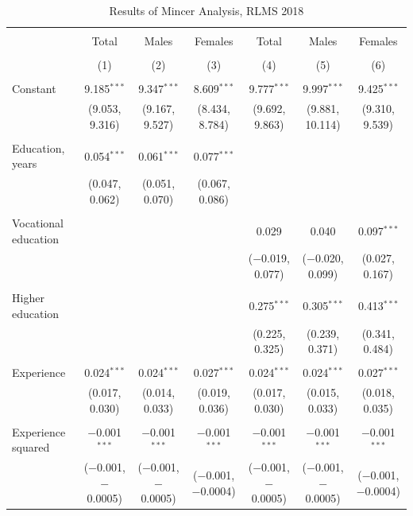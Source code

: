 \documentclass[alpha-refs]{wiley-article-01g}
\begin{document}
\begin{landscape}

\fontsize{9}{11}
\selectfont

\begin{table}[!htbp] \centering 
\renewcommand{\arraystretch}{1.0}
  \caption{Results of Mincer Analysis, RLMS 2018} 
  \label{} 
\begin{tabular}{@{\extracolsep{5pt}}lcccccc} 
\\[-1.8ex]\hline 
\hline \\[-1.8ex] 
 & Total & Males & Females & Total & Males & Females \\ 
\\[-1.8ex] & (1) & (2) & (3) & (4) & (5) & (6)\\ 
\hline \\[-1.8ex] 
 Constant & 9.185$^{***}$ & 9.347$^{***}$ & 8.609$^{***}$ & 9.777$^{***}$ & 9.997$^{***}$ & 9.425$^{***}$ \\ 
  & (9.053, 9.316) & (9.167, 9.527) & (8.434, 8.784) & (9.692, 9.863) & (9.881, 10.114) & (9.310, 9.539) \\ 
  & & & & & & \\ 
 Education, years & 0.054$^{***}$ & 0.061$^{***}$ & 0.077$^{***}$ &  &  &  \\ 
  & (0.047, 0.062) & (0.051, 0.070) & (0.067, 0.086) &  &  &  \\ 
  & & & & & & \\ 
 Vocational education &  &  &  & 0.029 & 0.040 & 0.097$^{***}$ \\ 
  &  &  &  & ($-$0.019, 0.077) & ($-$0.020, 0.099) & (0.027, 0.167) \\ 
  & & & & & & \\ 
 Higher education &  &  &  & 0.275$^{***}$ & 0.305$^{***}$ & 0.413$^{***}$ \\ 
  &  &  &  & (0.225, 0.325) & (0.239, 0.371) & (0.341, 0.484) \\ 
  & & & & & & \\ 
 Experience & 0.024$^{***}$ & 0.024$^{***}$ & 0.027$^{***}$ & 0.024$^{***}$ & 0.024$^{***}$ & 0.027$^{***}$ \\ 
  & (0.017, 0.030) & (0.014, 0.033) & (0.019, 0.036) & (0.017, 0.030) & (0.015, 0.033) & (0.018, 0.035) \\ 
  & & & & & & \\ 
 Experience squared & $-$0.001$^{***}$ & $-$0.001$^{***}$ & $-$0.001$^{***}$ & $-$0.001$^{***}$ & $-$0.001$^{***}$ & $-$0.001$^{***}$ \\ 
  & ($-$0.001, $-$0.0005) & ($-$0.001, $-$0.0005) & ($-$0.001, $-$0.0004) & ($-$0.001, $-$0.0005) & ($-$0.001, $-$0.0005) & ($-$0.001, $-$0.0004) \\ 

\end{tabular}
\end{table}
\end{landscape}
\end{document}
